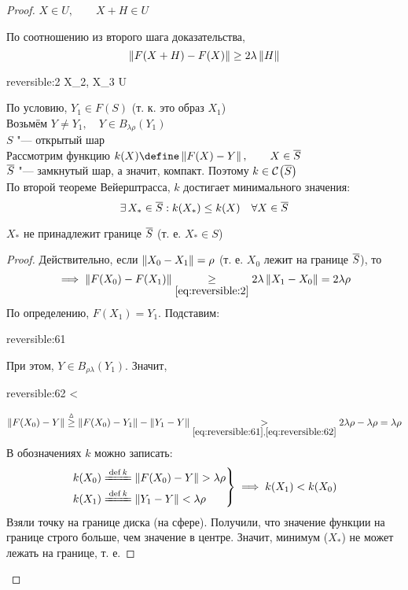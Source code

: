 \begin{proof}
	$ X \in U, \qquad X + H \in U $

	По соотношению  из второго шага доказательства,
	$$ \left\|{F(X + H) - F(X)}\right\| \ge 2\lambda\left\|{H}\right\| $$
	\begin{equ}{reversible:2}
		\iff {} \lambda{} \qquad \forall X_2, X_3 \in U
	\end{equ}
	По условию, $ Y_1 \in F(S) $ (т. к. это образ $ X_1 $) \\
	Возьмём $ Y \ne Y_1, \quad Y \in B_{\lambda\rho}(Y_1) $ \\
	$ S $ "--- открытый шар \\
	Рассмотрим функцию $ k(X) \define \norm{F(X) - Y}, \qquad X \in \ol{S} $ \\
	$ \overline{S} $ "--- замкнутый шар, а значит, компакт. Поэтому $ k \in \mathcal{C}^{} \big( {\overline{S}} \big)  $ \\
	По второй теореме Вейерштрасса, $ k $ достигает минимального значения:
	$$ \exists\, X_* \in \overline{S} : k(X_*) \le k(X) \quad \forall X \in \overline{S} $$
	\begin{statement}
		$ X_* $ не принадлежит границе $ \overline{S} $ (т. е. $ X_* \in S $)
	\end{statement}
	\begin{proof}
		Действительно, если $ \left\|{X_0 - X_1}\right\| = \rho $ (т. е. $ X_0 $ лежит на границе $ \overline{S} $), то
		$$ \implies \norm{F(X_0) - F(X_1)} \underset{\eref{reversible:2}}\ge 2\lambda\norm{X_1 - X_0} = 2\lambda\rho $$
		По определению, $ F(X_1) = Y_1 $. Подставим:
		\begin{equ}{reversible:61}
			 \lambda\rho
		\end{equ}
		При этом, $ Y \in B_{\rho\lambda}(Y_1) $. Значит,
		\begin{equ}{reversible:62}
			 < \lambda\rho
		\end{equ}
		$$ \norm{F(X_0) - Y} \trige \norm{F(X_0) - Y_1} - \norm{Y_1 - Y} \underset{\eref{reversible:61}, \eref{reversible:62}}> 2\lambda\rho - \lambda\rho = \lambda\rho $$
		В обозначениях $ k $ можно записать:
		$$
		\begin{rcases}
			k(X_0) \bdefeq{k} \norm{F(X_0) - Y} > \lambda\rho \\
			k(X_1) \bdefeq{k} \norm{Y_1 - Y} < \lambda\rho
		\end{rcases} \implies k(X_1) < k(X_0) $$
		Взяли точку на границе диска (на сфере). Получили, что значение функции на границе строго больше, чем значение в центре. Значит, минимум ($ X_* $) не может лежать на границе, т. е.

\end{proof}
\end{proof}
